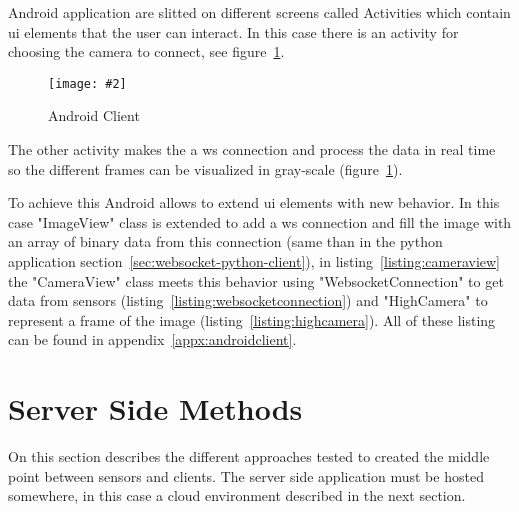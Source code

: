 \documentclass[hidelinks,11pt,a4paper,oneside,article]{memoir}
\newcommand{\putimage}[3][10] %
{
\begin{figure}[h]
	\centering
	\captionsetup{justification=centering}
	\texttt{[image: \#2]}
	\caption{#3}
	\label{fig:#2}
\end{figure}
}
\begin{document}
Android application are slitted on different screens called Activities which contain \gls{ui} elements that the user can interact. In this case there is an activity for choosing the camera to connect, see figure~\ref{fig:android-client3}.

    \putimage[16]{android-client3}{Android Client}

The other activity makes the a \gls{ws} connection and process the data in real time so the different frames can be visualized in gray-scale (figure~\ref{fig:android-client3}).

To achieve this Android allows to extend \gls{ui} elements with new behavior. In this case "ImageView" class is extended to add a \gls{ws} connection and fill the image with an array of binary data from this connection (same than in the python application section~\ref{sec:websocket-python-client}), in listing~\ref{listing:cameraview} the "CameraView" class meets this behavior using "WebsocketConnection" to get data from sensors (listing~\ref{listing:websocketconnection}) and "HighCamera" to represent a frame of the image (listing~\ref{listing:highcamera}). All of these listing can be found in appendix~\ref{appx:androidclient}.


\section{Server Side Methods}\label{sec:server-side-methods} 
On this section describes the different approaches tested to created the middle point between sensors and clients. The server side application must be hosted somewhere, in this case a cloud environment described in the next section.
\end{document}
